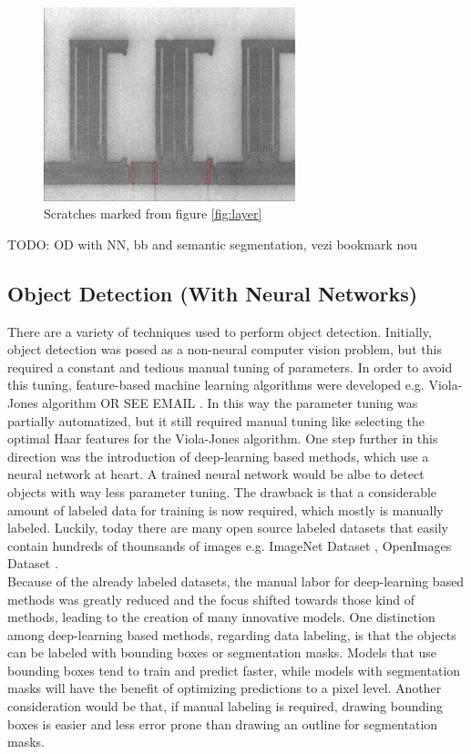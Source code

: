 \begin{figure}[ht]
  \includegraphics[width=0.65\textwidth]{images/layer_00325_marked_cropped}
  \centering
  \caption{Scratches marked from figure \ref{fig:layer}}
  \label{fig:layer_00325_marked_cropped}
\end{figure}

TODO: OD with NN, bb and semantic segmentation, vezi bookmark nou
\subsection{Object Detection (With Neural Networks)}
There are a variety of techniques used to perform object detection. Initially, object detection was posed as a non-neural computer vision problem, but this required a constant and tedious manual tuning of parameters. In order to avoid this tuning, feature-based machine learning algorithms were developed e.g. Viola-Jones algorithm OR SEE EMAIL  \cite{viola_joines_paper}. In this way the parameter tuning was partially automatized, but it still required manual tuning like selecting the optimal Haar features for the Viola-Jones algorithm.
One step further in this direction was the introduction of deep-learning based methods, which use a neural network at heart. A trained neural network would be albe to detect objects with way less parameter tuning. The drawback is that a considerable amount of labeled data for training is now required, which mostly is manually labeled. Luckily, today there are many open source labeled datasets that easily contain hundreds of thounsands of images e.g. ImageNet Dataset \cite{imagenet_site}, OpenImages Dataset \cite{openimages_site}. \\
Because of the already labeled datasets, the manual labor for deep-learning based methods was greatly reduced and the focus shifted towards those kind of methods, leading to the creation of many innovative models. One distinction among deep-learning based methods, regarding data labeling, is that the objects can be labeled with bounding boxes or segmentation masks. Models that use bounding boxes tend to train and predict faster, while models with segmentation masks will have the benefit of optimizing predictions to a pixel level. Another consideration would be that, if manual labeling is required, drawing bounding boxes is easier and less error prone than drawing an outline for segmentation masks. \\

